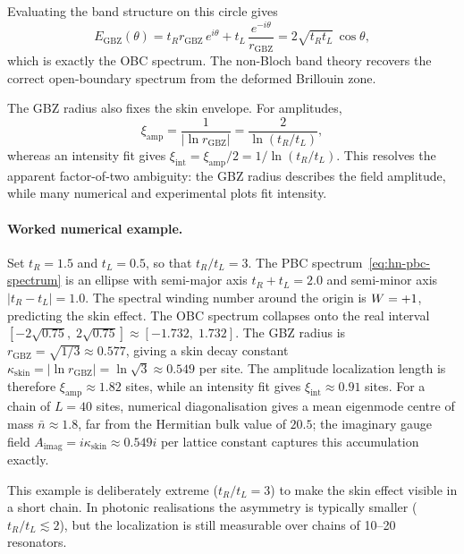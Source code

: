 Evaluating the
band structure on this circle gives
\begin{equation}
 E_{\mathrm{GBZ}}(\theta) = t_R r_{\mathrm{GBZ}}\,e^{i\theta}
 + t_L\,\frac{e^{-i\theta}}{r_{\mathrm{GBZ}}}
 = 2\sqrt{t_R t_L}\,\cos\theta,
 \label{eq:hn-gbz-bands}
\end{equation}
which is exactly the OBC spectrum. The non-Bloch band theory recovers
the correct open-boundary spectrum from the deformed Brillouin zone.

The GBZ radius also fixes the skin envelope.  For amplitudes,
\begin{equation}
  \xi_{\mathrm{amp}} = \frac{1}{|\ln r_{\mathrm{GBZ}}|}
  = \frac{2}{\ln(t_R/t_L)},
  \label{eq:hn-amplitude-length}
\end{equation}
whereas an intensity fit gives
$\xi_{\mathrm{int}}=\xi_{\mathrm{amp}}/2=1/\ln(t_R/t_L)$.  This resolves
the apparent factor-of-two ambiguity: the GBZ radius describes the field
amplitude, while many numerical and experimental plots fit intensity.

\paragraph{Worked numerical example.}
Set $t_R = 1.5$ and $t_L = 0.5$, so that $t_R/t_L = 3$. The PBC
spectrum~\eqref{eq:hn-pbc-spectrum} is an ellipse with semi-major axis
$t_R + t_L = 2.0$ and semi-minor axis $|t_R - t_L| = 1.0$. The spectral
winding number around the origin is $W = +1$, predicting the skin
effect. The OBC spectrum collapses onto the real interval
$[-2\sqrt{0.75},\; 2\sqrt{0.75}] \approx [-1.732,\; 1.732]$. The GBZ
radius is $r_{\mathrm{GBZ}} = \sqrt{1/3} \approx 0.577$, giving a
skin decay constant $\kappa_{\mathrm{skin}} = |\ln r_{\mathrm{GBZ}}|
= \ln\sqrt{3} \approx 0.549$ per site.  The amplitude localization
length is therefore $\xi_{\mathrm{amp}}\approx 1.82$ sites, while an
intensity fit gives $\xi_{\mathrm{int}}\approx 0.91$ sites. For a chain
of $L = 40$ sites,
numerical diagonalisation gives a mean eigenmode centre of mass
$\bar{n} \approx 1.8$, far from the Hermitian bulk value of $20.5$;
the imaginary gauge field $A_{\mathrm{imag}} = i\kappa_{\mathrm{skin}}
\approx 0.549i$ per lattice constant captures this accumulation exactly.

This example is deliberately extreme ($t_R/t_L = 3$) to make the skin
effect visible in a short chain. In photonic realisations the asymmetry is
typically smaller ($t_R/t_L \lesssim 2$), but the localization is still
measurable over chains of 10--20 resonators.

